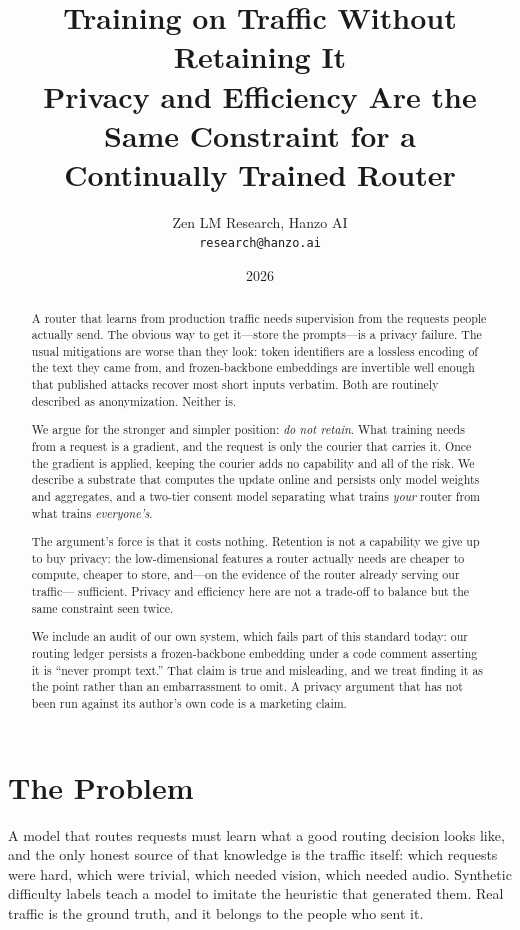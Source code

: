 \documentclass[11pt,a4paper]{article}
\title{\textbf{Training on Traffic Without Retaining It}\\
\large Privacy and Efficiency Are the Same Constraint for a\\
Continually Trained Router}
\author{Zen LM Research, Hanzo AI\\
\texttt{research@hanzo.ai}}
\date{2026}
\begin{document}
\maketitle

\begin{abstract}
A router that learns from production traffic needs supervision from the requests people
actually send. The obvious way to get it---store the prompts---is a privacy failure. The
usual mitigations are worse than they look: token identifiers are a lossless encoding of
the text they came from, and frozen-backbone embeddings are invertible well enough that
published attacks recover most short inputs verbatim. Both are routinely described as
anonymization. Neither is.

We argue for the stronger and simpler position: \emph{do not retain}. What training needs
from a request is a gradient, and the request is only the courier that carries it. Once
the gradient is applied, keeping the courier adds no capability and all of the risk. We
describe a substrate that computes the update online and persists only model weights and
aggregates, and a two-tier consent model separating what trains \emph{your} router from
what trains \emph{everyone's}.

The argument's force is that it costs nothing. Retention is not a capability we give up to
buy privacy: the low-dimensional features a router actually needs are cheaper to compute,
cheaper to store, and---on the evidence of the router already serving our traffic---
sufficient. Privacy and efficiency here are not a trade-off to balance but the same
constraint seen twice.

We include an audit of our own system, which fails part of this standard today: our
routing ledger persists a frozen-backbone embedding under a code comment asserting it is
``never prompt text.'' That claim is true and misleading, and we treat finding it as the
point rather than an embarrassment to omit. A privacy argument that has not been run
against its author's own code is a marketing claim.
\end{abstract}

\section{The Problem}

A model that routes requests must learn what a good routing decision looks like, and the
only honest source of that knowledge is the traffic itself: which requests were hard, which
were trivial, which needed vision, which needed audio. Synthetic difficulty labels teach a
model to imitate the heuristic that generated them. Real traffic is the ground truth, and
it belongs to the people who sent it.
\end{document}
